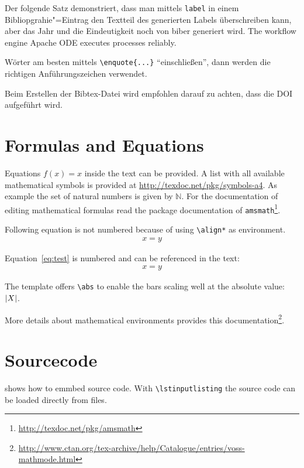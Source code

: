 Der folgende Satz demonstriert, dass man mittels \texttt{label} in einem Bibliopgrahie"=Eintrag den Textteil des generierten Labels überschreiben kann, aber das Jahr und die Eindeutigkeit noch von biber generiert wird.
The workflow engine Apache ODE \cite{ApacheODE} executes \BPEL processes reliably.

Wörter am besten mittels \texttt{\textbackslash enquote\{...\}} \enquote{einschließen}, dann werden die richtigen Anführungszeichen verwendet.

Beim Erstellen der Bibtex-Datei wird empfohlen darauf zu achten, dass die DOI aufgeführt wird.

\section{Formulas and Equations}
\label{sec:mf}
Equations $f(x)=x$ inside the text can be provided.
A list with all available mathematical symbols is provided at \url{http://texdoc.net/pkg/symbols-a4}.
As example the set of natural numbers is given by $\mathbb{N}$.
For the documentation of editing mathematical formulas read the package documentation of \texttt{amsmath}\footnote{\url{http://texdoc.net/pkg/amsmath}}.

Following equation is not numbered because of using \texttt{\textbackslash align*} as environment.
\begin{align*}
  x = y
\end{align*}

Equation~\ref{eq:test} is numbered and can be referenced in the text:
\begin{align}
  \label{eq:test}
  x = y
\end{align}

The template offers \verb+\abs+ to enable the bars scaling well at the absolute value:
$\left\lvert X\right\rvert$.

More details about mathematical environments provides this documentation\footnote{\url{http://www.ctan.org/tex-archive/help/Catalogue/entries/voss-mathmode.html}}.


\section{Sourcecode}
 shows how to emmbed source code.
With \texttt{\textbackslash lstinputlisting} the source code can be loaded directly from files.

